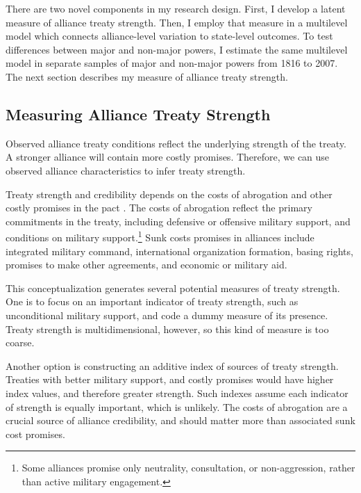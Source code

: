 \documentclass[12pt]{article}
\begin{document}

There are two novel components in my research design. 
First, I develop a latent measure of alliance treaty strength. 
Then, I employ that measure in a multilevel model which connects alliance-level variation to state-level outcomes. 
To test differences between major and non-major powers, I estimate the same multilevel model in separate samples of major and non-major powers from 1816 to 2007. 
The next section describes my measure of alliance treaty strength. 


\subsection{Measuring Alliance Treaty Strength} 

Observed alliance treaty conditions reflect the underlying strength of the treaty. 
A stronger alliance will contain more costly promises. 
Therefore, we can use observed alliance characteristics to infer treaty strength.


Treaty strength and credibility depends on the costs of abrogation and other costly promises in the pact \citep{Leeds2003}. 
The costs of abrogation reflect the primary commitments in the treaty, including defensive or offensive military support, and conditions on military support.\footnote{Some alliances promise only neutrality, consultation, or non-aggression, rather than active military engagement.}  
Sunk costs promises in alliances include integrated military command, international organization formation, basing rights, promises to make other agreements, and economic or military aid. 


This conceptualization generates several potential measures of treaty strength. 
One is to focus on an important indicator of treaty strength, such as unconditional military support, and code a dummy measure of its presence. 
Treaty strength is multidimensional, however, so this kind of measure is too coarse. 


Another option is constructing an additive index of sources of treaty strength. 
Treaties with better military support, and costly promises would have higher index values, and therefore greater strength. 
Such indexes assume each indicator of strength is equally important, which is unlikely. 
The costs of abrogation are a crucial source of alliance credibility, and should matter more than associated sunk cost promises. 
\end{document}

